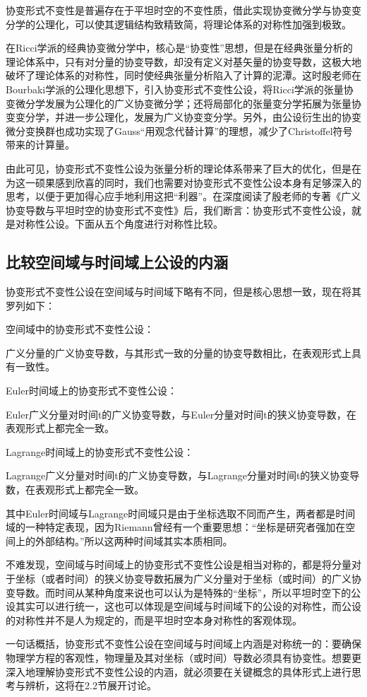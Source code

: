 \documentclass[UTF8]{ctexart}
\begin{document}
协变形式不变性是普遍存在于平坦时空的不变性质，借此实现协变微分学与协变变分学的公理化，可以使其逻辑结构致精致简，将理论体系的对称性加强到极致。\par
在Ricci学派的经典协变微分学中，核心是“协变性”思想，但是在经典张量分析的理论体系中，只有对分量的协变导数，却没有定义对基矢量的协变导数，这极大地破坏了理论体系的对称性，同时使经典张量分析陷入了计算的泥潭。这时殷老师在Bourbaki学派的公理化思想下，引入协变形式不变性公设，将Ricci学派的张量协变微分学发展为公理化的广义协变微分学；还将局部化的张量变分学拓展为张量协变变分学，并进一步公理化，发展为广义协变变分学。另外，由公设衍生出的协变微分变换群也成功实现了Gauss“用观念代替计算”的理想，减少了Christoffel符号带来的计算量。\par
由此可见，协变形式不变性公设为张量分析的理论体系带来了巨大的优化，但是在为这一硕果感到欣喜的同时，我们也需要对协变形式不变性公设本身有足够深入的思考，以便于更加得心应手地利用这把“利器”。在深度阅读了殷老师的专著《广义协变导数与平坦时空的协变形式不变性》后，我们断言：协变形式不变性公设，就是对称性公设。下面从五个角度进行对称性比较。\par
\subsection{比较空间域与时间域上公设的内涵}
协变形式不变性公设在空间域与时间域下略有不同，但是核心思想一致，现在将其罗列如下：\par
空间域中的协变形式不变性公设：\par
广义分量的广义协变导数，与其形式一致的分量的协变导数相比，在表观形式上具有一致性。\par
Euler时间域上的协变形式不变性公设：\par
Euler广义分量对时间t的广义协变导数，与Euler分量对时间t的狭义协变导数，在表观形式上都完全一致。\par
Lagrange时间域上的协变形式不变性公设：\par
Lagrange广义分量对时间t的广义协变导数，与Lagrange分量对时间t的狭义协变导数，在表观形式上都完全一致。\par
其中Euler时间域与Lagrange时间域只是由于坐标选取不同而产生，两者都是时间域的一种特定表现，因为Riemann曾经有一个重要思想：“坐标是研究者强加在空间上的外部结构。”所以这两种时间域其实本质相同。\par
不难发现，空间域与时间域上的协变形式不变性公设是相当对称的，都是将分量对于坐标（或者时间）的狭义协变导数拓展为广义分量对于坐标（或时间）的广义协变导数。而时间从某种角度来说也可以认为是特殊的“坐标”，所以平坦时空下的公设其实可以进行统一，这也可以体现是空间域与时间域下的公设的对称性，而公设的对称性并不是人为规定的，而是平坦时空本身对称性的客观体现。\par
一句话概括，协变形式不变性公设在空间域与时间域上内涵是对称统一的：要确保物理学方程的客观性，物理量及其对坐标（或时间）导数必须具有协变性。想要更深入地理解协变形式不变性公设的内涵，就必须要在关键概念的具体形式上进行思考与辨析，这将在2.2节展开讨论。\par
\end{document}
